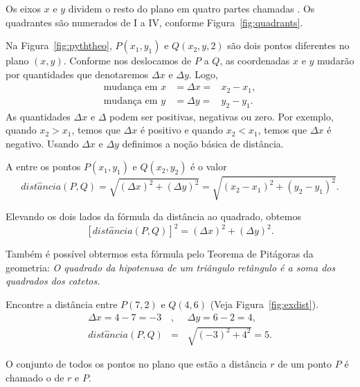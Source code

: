 Os eixos $x$ e $y$ dividem o resto do plano em quatro partes chamadas
. Os quadrantes são numerados de I a IV, conforme
Figura~\ref{fig:quadrants}.

Na Figura~\ref{fig:pyththeo}, $P(x_1,y_1)$ e $Q(x_2,y,2)$ são dois
pontos diferentes no plano $(x,y)$. Conforme nos deslocamos de $P$
a $Q$, as coordenadas $x$ e $y$ mudarão por quantidades que
denotaremos $\Delta x$ e $\Delta y$. Logo,
\begin{eqnarray*}
\text{mudança em } x & = \Delta x = & x_2 - x_1, \\
\text{mudança em } y & = \Delta y = & y_2 - y_1.
\end{eqnarray*}
As quantidades $\Delta x$ e $\Delta$ podem ser positivas, negativas ou
zero. Por exemplo, quando $x_2 > x_1$, temos que $\Delta x$ é positivo
e quando $x_2 < x_1$, temos que $\Delta x$ é negativo. Usando $\Delta x$
e $\Delta y$ definimos a noção básica de distância.


\begin{defin}
A  entre os pontos $P(x_1,y_1)$ e $Q(x_2,y_2)$ é
o valor
\[
  dist\hat{a}ncia(P,Q) = \sqrt{(\Delta x)^2 + (\Delta y)^2}
                       = \sqrt{(x_2 - x_1)^2 + (y_2 - y_1)^2}.
\]
\end{defin}

Elevando os dois lados da fórmula da distância ao quadrado, obtemos
\[
  [dist\hat{a}ncia(P,Q)]^2 = (\Delta x)^2 + (\Delta y)^2.
\]

Também é possível obtermos esta fórmula pelo Teorema de Pitágoras
da geometria: \emph{O quadrado da hipotenusa de um triângulo
retângulo é a soma dos quadrados dos catetos.}

\begin{example}
\label{ex:distance}
Encontre a distância entre $P(7,2)$ e $Q(4,6)$
(Veja Figura~\ref{fig:exdist}).
\begin{eqnarray*}
\Delta x = 4 - 7 = -3 &,\phantom{,} & \Delta y = 6 - 2 = 4, \\
 dist\hat{a}ncia(P,Q) & =           & \sqrt{(-3)^2 + 4^2} = 5.
\end{eqnarray*}
\end{example}


\begin{defin}[círculo]
O conjunto de todos os pontos no plano que estão a distância $r$ de um ponto
$P$ é chamado o  de  $r$ e  $P$.
\end{defin}


